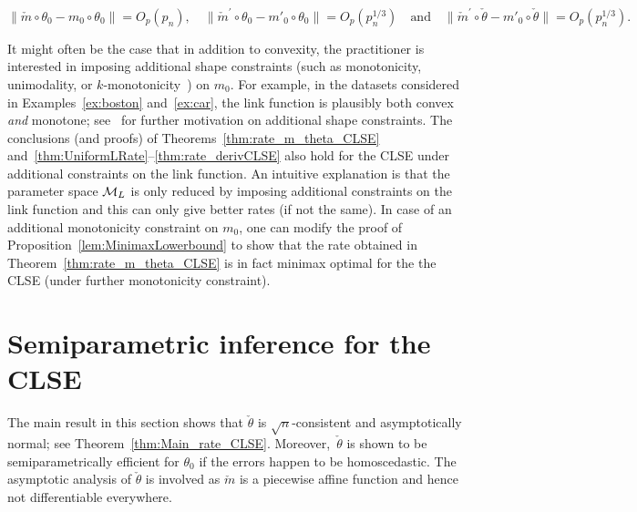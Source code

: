 {\begin{remark}
{\[
\|\check{m}\circ \theta_0- m_0\circ \theta_0 \|  = O_p(p_n), \quad \|\check{m}^\prime \circ \theta_0- m'_0 \circ \theta_0\| = O_p(p_n^{1/3})\quad \text{and} \quad  \|\check{m}^\prime \circ \check\theta- m'_0\circ\check\theta\|= O_p(p_n^{1/3}).
\]}
\end{remark}
\begin{remark}\label{rem:Monotone} {It might often be the case that in addition to convexity, the practitioner is interested in {imposing additional shape constraints (such as monotonicity, unimodality, or $k$-monotonicity~\cite{MR3881209}) on $m_0$.} For example, in the datasets considered in Examples~\ref{ex:boston} and~\ref{ex:car}, the link function is {plausibly} both convex \textit{and} monotone; see~\cite{CHSA} for further motivation {on} additional shape constraints. The conclusions (and proofs) of {Theorems~\ref{thm:rate_m_theta_CLSE} and~\ref{thm:UniformLRate}--\ref{thm:rate_derivCLSE}} also hold for the  CLSE under additional constraints {on the link function}. An intuitive explanation is that the parameter space $\mathcal{M}_L$ is only reduced by imposing {additional constraints} on the link function and this can only give better rates (if not the same). In case of an additional monotonicity constraint on $m_0$, one can modify the proof of Proposition~\ref{lem:MinimaxLowerbound} to show that {the} rate obtained in Theorem~\ref{thm:rate_m_theta_CLSE} is in fact minimax optimal for {the} the CLSE  (under further monotonicity constraint). }


\end{remark}



\section{Semiparametric inference for the CLSE} \label{sec:SemiInf}
The main result in this section shows that $\check{\theta}$ is $\sqrt{n}$-consistent and asymptotically normal; see Theorem~\ref{thm:Main_rate_CLSE}. Moreover,~$\check{\theta}$ is shown to be semiparametrically efficient for $\theta_0$ if the errors happen to be homoscedastic. The asymptotic analysis of $\check \theta$  is involved  as $\check{m}$ is a piecewise affine function and hence not differentiable everywhere.

}
